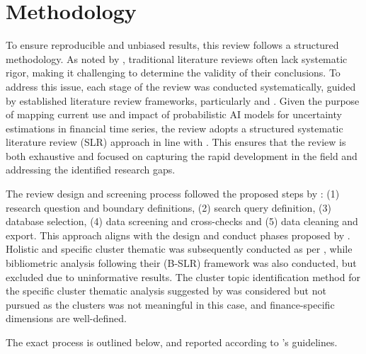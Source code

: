 \section{Methodology}
\label{sec:methodology}

To ensure reproducible and unbiased results, this review follows a structured methodology. As noted by \textcite{tranfield_et_al}, traditional literature reviews often lack systematic rigor, making it challenging to determine the validity of their conclusions. To address this issue, each stage of the review was conducted systematically, guided by established literature review frameworks, particularly \textcite{snyder_2019} and \textcite{marzi_et_al_2024}. Given the purpose of mapping current use and impact of probabilistic AI models for uncertainty estimations in financial time series, the review adopts a structured systematic literature review (SLR) approach in line with \textcite{snyder_2019}. This ensures that the review is both exhaustive and focused on capturing the rapid development in the field and addressing the identified research gaps. 

The review design and screening process followed the proposed steps by \textcite{marzi_et_al_2024}: (1) research question and boundary definitions, (2) search query definition, (3) database selection, (4) data screening and cross-checks and (5) data cleaning and export. This approach aligns with the design and conduct phases proposed by \textcite{snyder_2019}. Holistic and specific cluster thematic was subsequently conducted as per \cite{marzi_et_al_2024}, while bibliometric analysis following their (B-SLR) framework was also conducted, but excluded due to uninformative results. The cluster topic identification method for the specific cluster thematic analysis suggested by \cite{marzi_et_al_2024} was considered but not pursued as the clusters was not meaningful in this case, and finance-specific dimensions are well-defined. 

The exact process is outlined below, and reported according to \textcite{marzi_et_al_2024}'s guidelines.

